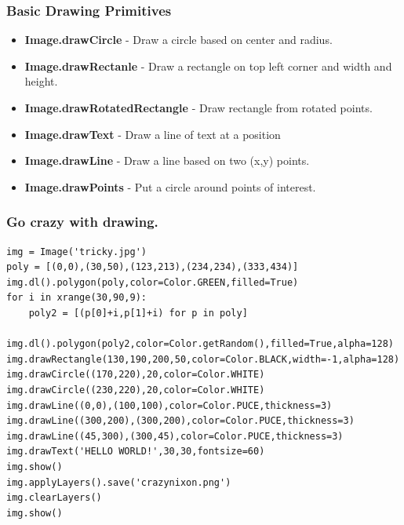 \documentclass{beamer}
\begin{document}
\begin{frame}
\frametitle{Basic Drawing Primitives}
\begin{itemize}
  \item \textbf{Image.drawCircle} - Draw a circle based on center and radius.
  \item \textbf{Image.drawRectanle} - Draw a rectangle on top left
    corner and width and height.
  \item \textbf{Image.drawRotatedRectangle} - Draw rectangle from
    rotated points.
  \item \textbf{Image.drawText} - Draw a line of text at a position
  \item \textbf{Image.drawLine} - Draw a line based on two (x,y) points.
  \item \textbf{Image.drawPoints} - Put a circle around points of
    interest. 
\end{itemize}
\end{frame}
\begin{frame}[fragile] 
\frametitle{Go crazy with drawing.}
\begin{example}
\begin{verbatim}
img = Image('tricky.jpg')
poly = [(0,0),(30,50),(123,213),(234,234),(333,434)]
img.dl().polygon(poly,color=Color.GREEN,filled=True)
for i in xrange(30,90,9):
    poly2 = [(p[0]+i,p[1]+i) for p in poly]
    img.dl().polygon(poly2,color=Color.getRandom(),filled=True,alpha=128)
img.drawRectangle(130,190,200,50,color=Color.BLACK,width=-1,alpha=128)
img.drawCircle((170,220),20,color=Color.WHITE)
img.drawCircle((230,220),20,color=Color.WHITE)
img.drawLine((0,0),(100,100),color=Color.PUCE,thickness=3)
img.drawLine((300,200),(300,200),color=Color.PUCE,thickness=3)
img.drawLine((45,300),(300,45),color=Color.PUCE,thickness=3)
img.drawText('HELLO WORLD!',30,30,fontsize=60)
img.show()
img.applyLayers().save('crazynixon.png')
img.clearLayers()
img.show()
\end{verbatim}
\end{example}
\end{frame}
\end{document}
